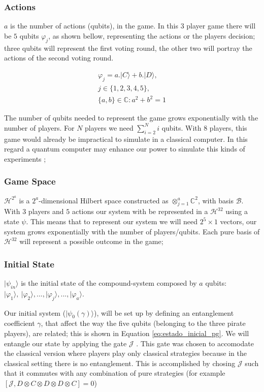 \documentclass[10pt,twocolumn]{llncs}
\begin{document}
\subsubsection{Actions} $a$ is the number of actions (qubits), in the game. In this $3$ player game there will be $5$ qubits $\varphi_{j}$, as shown bellow, representing the actions or the players decision; three qubits will represent the first voting round, the other two will portray the actions of the second voting round. 

\begin{equation}
\begin{split}
\varphi_{j} = a . \vert C \rangle + b . \vert D \rangle , \\  j \in \{ 1, 2, 3, 4, 5 \}, \\ \{ a,b \} \in \mathbb{C} : a^2 + b^2 =1
\end{split}
\label{eq:opvarphiquantumstates}
\end{equation}

The number of qubits needed to represent the game grows exponentially with the number of players. For $N$ players we need $\sum_{i=2}^{N}{i}$ qubits. With 8 players, this game would already be impractical to simulate in a classical computer. In this regard a quantum computer may enhance our power to simulate this kinds of experiments \cite{Rieffel2011}; 

\subsubsection{Game Space} $\mathcal{H}^{2^{a}}$ is a $2^{a}$-dimensional Hilbert space constructed
as $\otimes_{j=1}^{a}\mathbb{C}^{2}$, with basis $\mathcal{B}$. With $3$ players and $5$ actions our system with be represented in a $\mathcal{H}^{32}$ using a state $\psi$. This means that to represent our system we will need $2^{5}\times 1$ vectors, our system grows exponentially with the number of players/qubits. Each pure basis  of $\mathcal{H}^{32}$ will represent a possible outcome in the game;

\subsubsection{Initial State} $\vert\psi_{in}\rangle$ is the initial state of the compound-system
composed by $a$ qubits: $\vert\varphi_{1}\rangle,\:\vert\varphi_{2}\rangle, ..., \vert\varphi_{j}\rangle, ..., \vert\varphi_{a}\rangle$.

Our initial system ($\vert \psi_{0}(\gamma) \rangle$), will be set up by defining an entanglement coefficient $\gamma$, that affect the way the five qubits (belonging to the three pirate players), are related; this is shown in Equation \eqref{eq:estado_inicial_pg}. 
We will entangle our state by applying the gate $\mathcal{J}$ \cite{Letters2002}. This gate was chosen to accomodate the classical version where players play only classical strategies because in the classical setting there is no entanglement. This is accomplished by chosing $\mathcal{J}$ such that it commutes with any combination of pure strategies (for example $ [ \mathcal{J} , D \otimes C \otimes D \otimes D \otimes C ] = 0 $)
\end{document}
